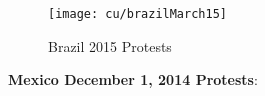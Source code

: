 
\begin{figure}[H]
\texttt{[image: cu/brazilMarch15]}
\caption{Brazil 2015 Protests}
\label{fig:brazilSpring}
\end{figure}


\textbf{Mexico December 1, 2014 Protests}:
